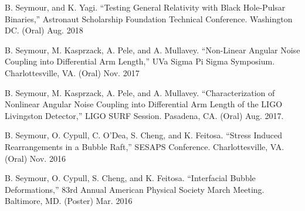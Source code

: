 \begin{cvpresentationsmod}

  \cvpresentation
    {B. Seymour, and K. Yagi. “Testing General Relativity with Black Hole-Pulsar Binaries,” Astronaut Scholarship Foundation Technical Conference. Washington DC. (Oral)} %
    {Aug. 2018} %



  \cvpresentation
    {B. Seymour, M. Kasprzack, A. Pele, and A. Mullavey. “Non-Linear Angular Noise Coupling into Differential Arm Length,” UVa Sigma Pi Sigma Symposium. Charlottesville, VA. (Oral)} %
    {Nov. 2017} %



  \cvpresentation
    {B. Seymour, M. Kasprzack, A. Pele, and A. Mullavey. “Characterization of Nonlinear Angular Noise Coupling into Differential Arm Length of the LIGO Livingston Detector,” LIGO SURF Session. Pasadena, CA. (Oral)} %
    {Aug. 2017.} %



  \cvpresentation
    {B. Seymour, O. Cypull, C. O’Dea, S. Cheng, and K. Feitosa. “Stress Induced Rearrangements in a Bubble Raft,” SESAPS Conference. Charlottesville, VA. (Oral)} %
    {Nov. 2016} %









  \cvpresentation
    {B. Seymour, O. Cypull, S. Cheng, and K. Feitosa. “Interfacial Bubble Deformations,” 83rd Annual American Physical Society March Meeting. Baltimore, MD. (Poster)} %
    {Mar. 2016} %




\end{cvpresentationsmod}
